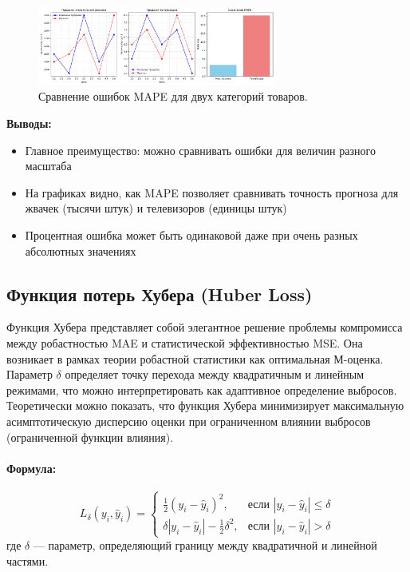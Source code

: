 \documentclass[12pt]{article}
\theoremstyle{definition}
\theoremstyle{definition}
\theoremstyle{definition}
\theoremstyle{remark}
\theoremstyle{remark}
\begin{document}
\begin{figure}[h!]
    \centering
    \includegraphics[width=0.7\textwidth]{imgs/mape.png}
    \caption{Сравнение ошибок MAPE для двух категорий товаров.}
    \label{fig:mape_graph}
\end{figure}

\noindent\textbf{Выводы:}
\begin{itemize}
    \item Главное преимущество: можно сравнивать ошибки для величин разного масштаба
    \item На графиках видно, как MAPE позволяет сравнивать точность прогноза для жвачек (тысячи штук) и телевизоров (единицы штук)
    \item Процентная ошибка может быть одинаковой даже при очень разных абсолютных значениях
\end{itemize}


\subsection{Функция потерь Хубера (Huber Loss)}

Функция Хубера представляет собой элегантное решение проблемы компромисса между робастностью MAE и статистической эффективностью MSE. Она возникает в рамках теории робастной статистики как оптимальная М-оценка. Параметр $\delta$ определяет точку перехода между квадратичным и линейным режимами, что можно интерпретировать как адаптивное определение выбросов. Теоретически можно показать, что функция Хубера минимизирует максимальную асимптотическую дисперсию оценки при ограниченном влиянии выбросов (ограниченной функции влияния).

\paragraph{Формула:}
\[
L_\delta(y_i, \hat{y}_i) = 
\begin{cases} 
\frac{1}{2} (y_i - \hat{y}_i)^2, & \text{если } |y_i - \hat{y}_i| \leq \delta \\
\delta |y_i - \hat{y}_i| - \frac{1}{2} \delta^2, & \text{если } |y_i - \hat{y}_i| > \delta
\end{cases}
\]
где $\delta$ — параметр, определяющий границу между квадратичной и линейной частями.
\end{document}
